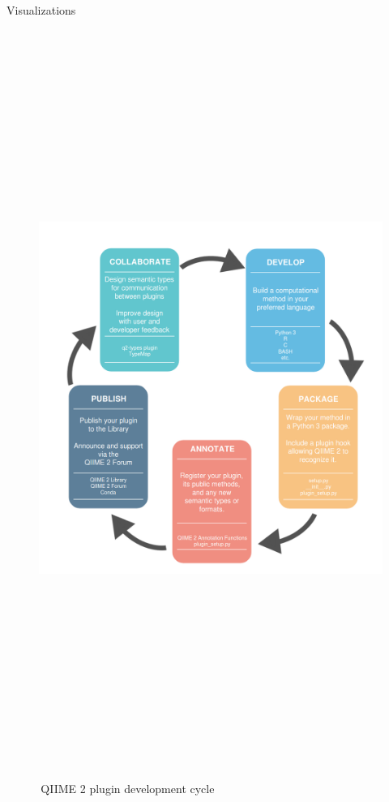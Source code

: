 \documentclass[final]{beamer}
\newlength{\colwidth}
\begin{document}
\begin{frame}[t]
\begin{columns}[t]
\begin{column}{\colwidth}
  \begin{block}{Visualizations}
    \begin{figure}[tph!]
    {\includegraphics[height=24cm]{assets/DevelopmentProcessDiagramFlattop}}
    \caption{\,QIIME 2 plugin development cycle }
    \label{fig:processDiagram}
    \end{figure}


\end{block}
\end{column}
\end{columns}
\end{frame}
\end{document}
